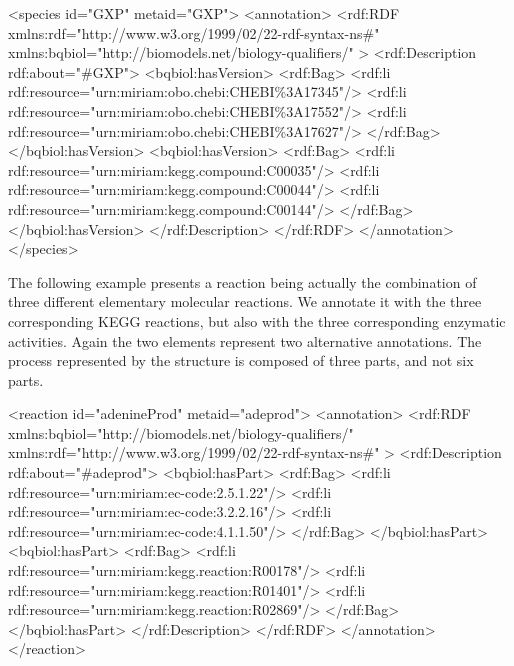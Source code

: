 \begin{blockChanged}
\begin{example}
<species id="GXP" metaid="GXP">
  <annotation>
    <rdf:RDF
      xmlns:rdf="http://www.w3.org/1999/02/22-rdf-syntax-ns\#"
      xmlns:bqbiol="http://biomodels.net/biology-qualifiers/"
    >
      <rdf:Description rdf:about="\#GXP">
        <bqbiol:hasVersion>
          <rdf:Bag>
            <rdf:li rdf:resource="urn:miriam:obo.chebi:CHEBI\%3A17345"/>
            <rdf:li rdf:resource="urn:miriam:obo.chebi:CHEBI\%3A17552"/>
            <rdf:li rdf:resource="urn:miriam:obo.chebi:CHEBI\%3A17627"/>
          </rdf:Bag>
        </bqbiol:hasVersion>
        <bqbiol:hasVersion>
          <rdf:Bag>
            <rdf:li rdf:resource="urn:miriam:kegg.compound:C00035"/>
            <rdf:li rdf:resource="urn:miriam:kegg.compound:C00044"/>
            <rdf:li rdf:resource="urn:miriam:kegg.compound:C00144"/>
          </rdf:Bag>
        </bqbiol:hasVersion>
      </rdf:Description>
    </rdf:RDF>
  </annotation>
</species>
\end{example}
\end{blockChanged}

The following example presents a reaction being actually the
combination of three different elementary molecular reactions. We
annotate it with the three corresponding KEGG reactions, but also
with the three corresponding enzymatic activities.  Again the two
 elements represent two alternative annotations.
The process represented by the \Reaction structure is
composed of three parts, and  not six parts.

\begin{blockChanged}
\begin{example}
<reaction id="adenineProd" metaid="adeprod">
  <annotation>
    <rdf:RDF
      xmlns:bqbiol="http://biomodels.net/biology-qualifiers/"
      xmlns:rdf="http://www.w3.org/1999/02/22-rdf-syntax-ns\#"
    >
      <rdf:Description rdf:about="\#adeprod">
        <bqbiol:hasPart>
          <rdf:Bag>
            <rdf:li rdf:resource="urn:miriam:ec-code:2.5.1.22"/>
            <rdf:li rdf:resource="urn:miriam:ec-code:3.2.2.16"/>
            <rdf:li rdf:resource="urn:miriam:ec-code:4.1.1.50"/>
          </rdf:Bag>
        </bqbiol:hasPart>
        <bqbiol:hasPart>
          <rdf:Bag>
            <rdf:li rdf:resource="urn:miriam:kegg.reaction:R00178"/>
            <rdf:li rdf:resource="urn:miriam:kegg.reaction:R01401"/>
            <rdf:li rdf:resource="urn:miriam:kegg.reaction:R02869"/>
          </rdf:Bag>
        </bqbiol:hasPart>
      </rdf:Description>
    </rdf:RDF>
  </annotation>
</reaction>
\end{example}
\end{blockChanged}

